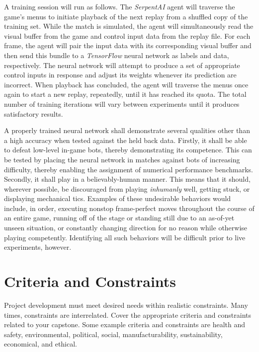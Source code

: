 A training session will run as follows. The {\it SerpentAI} agent will traverse the game's menus to initiate playback of the next replay from a shuffled copy of the training set. While the match is simulated, the agent will simultaneously read the visual buffer from the game and control input data from the replay file. For each frame, the agent will pair the input data with its corresponding visual buffer and then send this bundle to a {\it TensorFlow} neural network as labels and data, respectively. The neural network will attempt to produce a set of appropriate control inputs in response and adjust its weights  whenever its prediction are incorrect. When playback has concluded, the agent will traverse the menus once again to start a new replay, repeatedly, until it has reached its quota. The total number of training iterations will vary between experiments until it produces satisfactory results.

A properly trained neural network shall demonstrate several qualities other than a high accuracy when tested against the held back data. Firstly, it shall be able to defeat low-level in-game bots, thereby demonstrating its competence. This can be tested by placing the neural network in matches against bots of increasing difficulty, thereby enabling the assignment of numerical performance benchmarks. Secondly, it shall play in a believably-human manner. This means that it should, wherever possible, be discouraged from playing {\it inhumanly} well, getting stuck, or displaying mechanical tics. Examples of these undesirable behaviors would include, in order, executing nonstop frame-perfect moves throughout the course of an entire game, running off of the stage or standing still due to an as-of-yet unseen situation, or constantly changing direction for no reason while otherwise playing competently. Identifying all such behaviors will be difficult prior to live experiments, however.




\section{Criteria and Constraints}

Project development must meet desired needs within realistic constraints. Many times, constraints are interrelated. Cover the appropriate criteria and constraints related to your capstone. Some example criteria and constraints are health and safety, environmental, political, social, manufacturability, sustainability, economical, and ethical.

